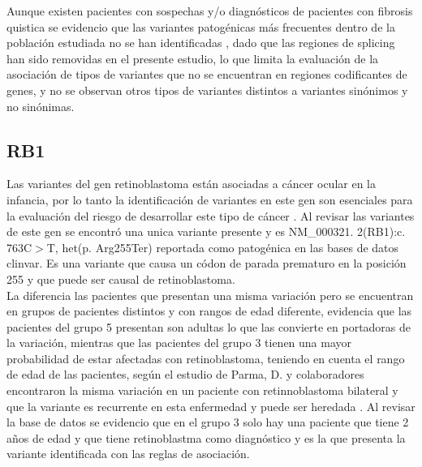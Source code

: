 Aunque existen pacientes con sospechas y/o diagnósticos de pacientes con fibrosis quistica se evidencio que las variantes patogénicas más frecuentes dentro de la población estudiada no se han identificadas \cite{Vasquez2010}, dado que las regiones de splicing han sido removidas en el presente estudio, lo que limita la evaluación de la asociación de tipos de variantes que no se encuentran en regiones codificantes de genes, y no se observan otros tipos de variantes distintos a variantes sinónimos y no sinónimas. 


\subsection*{RB1}

Las variantes del gen retinoblastoma están asociadas a cáncer ocular en la infancia, por lo tanto la identificación de variantes en este gen son esenciales para la evaluación del riesgo de desarrollar este tipo de cáncer \cite{Parma2017}. Al revisar las variantes de este gen se encontró una unica variante presente   y es NM\_000321. 2(RB1):c. 763C$>$T, het(p. Arg255Ter) reportada como patogénica en las bases de datos clinvar. Es una variante que causa un códon de parada prematuro en la posición 255 y que puede ser causal de retinoblastoma. \\  

La diferencia  las pacientes que presentan una misma variación pero se encuentran en grupos de pacientes distintos y con rangos de edad diferente, evidencia que las pacientes del grupo 5 presentan son adultas lo que las convierte en portadoras de la variación, mientras que las pacientes del grupo 3 tienen una mayor probabilidad de estar afectadas con retinoblastoma, teniendo en cuenta el rango de edad de las pacientes, según el estudio de Parma, D. y colaboradores encontraron la misma variación en un paciente con retinnoblastoma bilateral y que la variante es recurrente en esta enfermedad y puede ser heredada \cite{Parma2017}. Al revisar la base de datos se evidencio que en el grupo 3 solo hay una paciente que tiene 2 años de edad y que tiene retinoblastma como diagnóstico y es la que presenta la variante identificada con las reglas de asociación. \\

